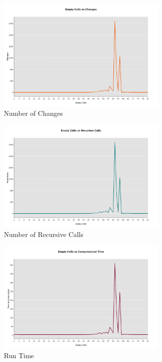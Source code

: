 \documentclass{article}
\begin{document}
        \begin{figure}[ht]
        \centering
        \includegraphics[width=0.75\textwidth]{Changes.png}
        \caption{Number of Changes}
    \end{figure}
    
        \begin{figure}[ht]
        \centering
        \includegraphics[width=0.75\textwidth]{Recursions.png}
        \caption{Number of Recursive Calls}
    \end{figure}
    
        \begin{figure}[ht]
        \centering
        \includegraphics[width=0.75\textwidth]{Time.png}
        \caption{Run Time}
    \end{figure}
\end{document}
